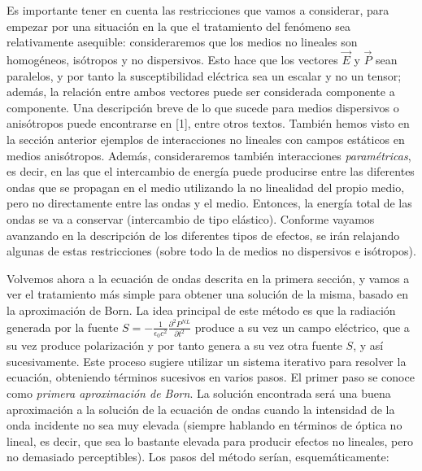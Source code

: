 \documentclass[12pt,a4paper]{report}
\newcommand{\esp}{\vspace{0.5cm}}
\begin{document}
	Es importante tener en cuenta las restricciones que vamos a considerar, para empezar por una situación en la que el tratamiento del fenómeno sea relativamente asequible: consideraremos que los medios no lineales son homogéneos, isótropos y no dispersivos. Esto hace que los vectores $\vec{E}$ y $\vec{P}$ sean paralelos, y por tanto la susceptibilidad eléctrica sea un escalar y no un tensor; además, la relación entre ambos vectores puede ser considerada componente a componente. Una descripción breve de lo que sucede para medios dispersivos o anisótropos puede encontrarse en [1], entre otros textos. También hemos visto en la sección anterior ejemplos de interacciones no lineales con campos estáticos en medios anisótropos. Además, consideraremos también interacciones \textit{paramétricas}, es decir, en las que el intercambio de energía puede producirse entre las diferentes ondas que se propagan en el medio utilizando la no linealidad del propio medio, pero no directamente entre las ondas y el medio. Entonces, la energía total de las ondas se va a conservar (intercambio de tipo elástico). Conforme vayamos avanzando en la descripción de los diferentes tipos de efectos, se irán relajando algunas de estas restricciones (sobre todo la de medios no dispersivos e isótropos).
	
	\esp
	
	Volvemos ahora a la ecuación de ondas descrita en la primera sección, y vamos a ver el tratamiento más simple para obtener una solución de la misma, basado en la aproximación de Born. La idea principal de este método es que la radiación generada por la fuente $S = -\frac{1}{\epsilon_0 c^2} \frac{\partial^2 P^{NL}}{\partial t^2}$ produce a su vez un campo eléctrico, que a su vez produce polarización y por tanto genera a su vez otra fuente $S$, y así sucesivamente. Este proceso sugiere utilizar un sistema iterativo para resolver la ecuación, obteniendo términos sucesivos en varios pasos. El primer paso se conoce como \textit{primera aproximación de Born}. La solución encontrada será una buena aproximación a la solución de la ecuación de ondas cuando la intensidad de la onda incidente no sea muy elevada (siempre hablando en términos de óptica no lineal, es decir, que sea lo bastante elevada para producir efectos no lineales, pero no demasiado perceptibles). Los pasos del método serían, esquemáticamente:
	
	\esp
	
\end{document}
